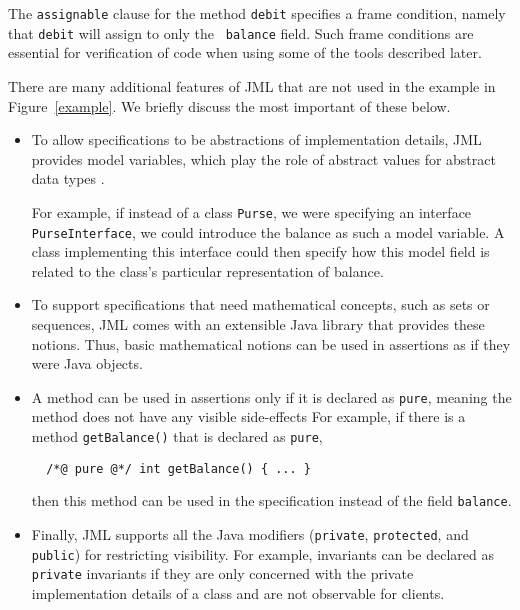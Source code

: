 \documentclass{entcs}
\begin{document}
The {\tt assignable} clause for the method {\tt debit} specifies a frame
condition, namely that {\tt debit} will assign to only the {\tt
  balance} field.  Such frame conditions are essential for
verification of code when using some of the tools described later.

\medskip

There are many additional features of JML that are not used in the
example in Figure~\ref{example}. We briefly discuss the most important
of these below.
\begin{itemize}
\item To allow specifications to be abstractions of implementation
  details, JML provides model variables, which play the role of
  abstract values for abstract data types \cite{Cheon-etal03}.

  For example, if instead of a class {\tt Purse}, we were specifying
  an interface {\tt PurseInterface}, we could introduce the balance as
  such a model variable.  A class implementing this interface could
  then specify how this model field is related to the class's
  particular representation of balance.
  
\item To support specifications that need mathematical concepts, such
  as sets or sequences, JML comes with an extensible Java library that
  provides these notions.  Thus, basic mathematical notions can be
  used in assertions as if they were Java objects.
  
\item A method can be used in assertions only if it is declared as
  {\tt pure}, meaning the method does not have any visible
  side-effects
  For
  example, if there is a method {\tt getBalance()} that is declared as
  {\tt pure},
\begin{verbatim}
  /*@ pure @*/ int getBalance() { ... }
\end{verbatim}
  then this method can be used in the specification instead of the field
  {\tt balance}.
\item Finally, JML supports all the Java modifiers ({\tt private},
  {\tt protected}, and {\tt public}) for restricting visibility.  For
  example, invariants can be declared as {\tt private} invariants if
  they are only concerned with the private implementation details of a
  class and are not observable for clients.
\end{itemize}
%
\end{document}
